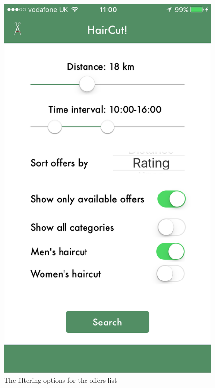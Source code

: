 \begin{figure}[!ht]
\centering
\includegraphics[scale=0.3]{img/barber-filters.png}
\caption{The filtering options for the offers list}
\label{fig:filters}
\end{figure}


